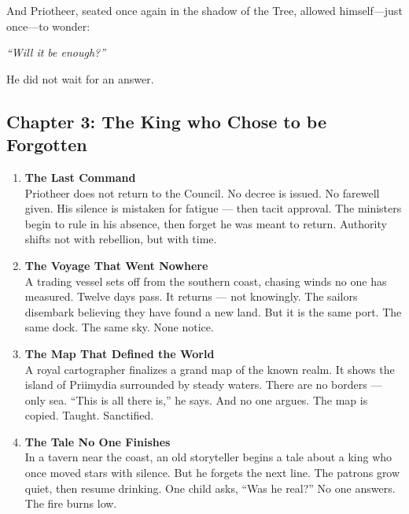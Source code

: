 \documentclass[9pt]{article}
\begin{document}
\vspace{0.5em}
And Priotheer, seated once again in the shadow of the Tree, allowed himself---just once---to wonder:

\vspace{0.5em}
\textit{``Will it be enough?''}

\vspace{0.5em}
He did not wait for an answer.


\newpage

\subsection*{Chapter 3: The King who Chose to be Forgotten}

\vspace{1in}

\begin{enumerate}
    \item \textbf{The Last Command} \\
    Priotheer does not return to the Council. No decree is issued. No farewell given. His silence is mistaken for fatigue — then tacit approval. The ministers begin to rule in his absence, then forget he was meant to return. Authority shifts not with rebellion, but with time.

    \vspace{1em}
    \item \textbf{The Voyage That Went Nowhere} \\
    A trading vessel sets off from the southern coast, chasing winds no one has measured. Twelve days pass. It returns — not knowingly. The sailors disembark believing they have found a new land. But it is the same port. The same dock. The same sky. None notice.

    \vspace{1em}
    \item \textbf{The Map That Defined the World} \\
    A royal cartographer finalizes a grand map of the known realm. It shows the island of Priimydia surrounded by steady waters. There are no borders — only sea. “This is all there is,” he says. And no one argues. The map is copied. Taught. Sanctified.

    \vspace{1em}
    \item \textbf{The Tale No One Finishes} \\
    In a tavern near the coast, an old storyteller begins a tale about a king who once moved stars with silence. But he forgets the next line. The patrons grow quiet, then resume drinking. One child asks, “Was he real?” No one answers. The fire burns low.


\end{enumerate}
\end{document}
